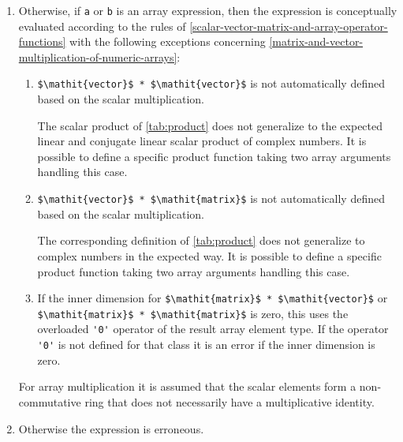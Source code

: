 \begin{enumerate}
\begin{nonnormative}
  Informally, this means: If there is no direct match of \lstinline!a $\theop$ b!, then it is tried to find a direct match by automatic type casts of \lstinline!a! or \lstinline!b!, by converting either \lstinline!a! or \lstinline!b! to the needed type using an appropriate constructor function from one of the operator record classes used as arguments of the overloaded \lstinline!op! functions.  Example using the \lstinline!Complex!-definition below:
\begin{lstlisting}[language=modelica]
Real a;
Complex b;
Complex c = a * b; // interpreted as:
// Complex.'*'.multiply(Complex.'constructor'.fromReal(a),b);
\end{lstlisting}
\end{nonnormative}
\item\label{overloaded-binary-arrays}
  Otherwise, if \lstinline!a! or \lstinline!b! is an array expression, then the expression is
  conceptually evaluated according to the rules of \cref{scalar-vector-matrix-and-array-operator-functions} with the
  following exceptions concerning \cref{matrix-and-vector-multiplication-of-numeric-arrays}:
  \begin{enumerate}
  \def\labelenumii{(\alph{enumii})}
  \item
    \lstinline!$\mathit{vector}$ * $\mathit{vector}$! is not automatically defined based on the scalar multiplication.
    \begin{nonnormative}
    The scalar product of \cref{tab:product} does not generalize to the expected linear and conjugate linear scalar product of complex numbers.
    It is possible to define a specific product function taking two array arguments handling this case.
    \end{nonnormative}
  \item
    \lstinline!$\mathit{vector}$ * $\mathit{matrix}$! is not automatically defined based on the scalar multiplication.
    \begin{nonnormative}
    The corresponding definition of \cref{tab:product} does not generalize to complex numbers in the expected way.
    It is possible to define a specific product function taking two array arguments handling this case.
    \end{nonnormative}
  \item
    If the inner dimension for \lstinline!$\mathit{matrix}$ * $\mathit{vector}$! or \lstinline!$\mathit{matrix}$ * $\mathit{matrix}$! is zero, this uses the overloaded \lstinline!'0'! operator of the result array element type.  If the operator \lstinline!'0'! is not defined for that class it is an error if the inner dimension is zero.
  \end{enumerate}

\begin{nonnormative}
For array multiplication it is assumed that the scalar elements
form a non-commutative ring that does not necessarily have a
multiplicative identity.
\end{nonnormative}

\item\label{overloaded-binary-error}
  Otherwise the expression is erroneous.
\end{enumerate}

